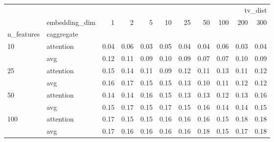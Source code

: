 \begin{tabular}{llrrrrrrrrr}
\toprule
 &  & \multicolumn{9}{r}{tv_dist} \\
 & embedding_dim & 1 & 2 & 5 & 10 & 25 & 50 & 100 & 200 & 300 \\
n_features & caggregate &  &  &  &  &  &  &  &  &  \\
\midrule
\multirow[t]{2}{*}{10} & attention & 0.04 & 0.06 & 0.03 & 0.05 & 0.04 & 0.04 & 0.06 & 0.03 & 0.04 \\
 & avg & 0.12 & 0.11 & 0.09 & 0.10 & 0.09 & 0.07 & 0.07 & 0.10 & 0.09 \\
\cline{1-11}
\multirow[t]{2}{*}{25} & attention & 0.15 & 0.14 & 0.11 & 0.09 & 0.12 & 0.11 & 0.13 & 0.11 & 0.12 \\
 & avg & 0.16 & 0.17 & 0.15 & 0.15 & 0.13 & 0.10 & 0.11 & 0.12 & 0.12 \\
\cline{1-11}
\multirow[t]{2}{*}{50} & attention & 0.14 & 0.14 & 0.16 & 0.15 & 0.13 & 0.13 & 0.12 & 0.13 & 0.16 \\
 & avg & 0.15 & 0.17 & 0.15 & 0.17 & 0.15 & 0.16 & 0.14 & 0.14 & 0.15 \\
\cline{1-11}
\multirow[t]{2}{*}{100} & attention & 0.17 & 0.15 & 0.15 & 0.16 & 0.16 & 0.16 & 0.15 & 0.18 & 0.18 \\
 & avg & 0.17 & 0.16 & 0.16 & 0.16 & 0.16 & 0.18 & 0.15 & 0.17 & 0.18 \\
\cline{1-11}
\bottomrule
\end{tabular}
